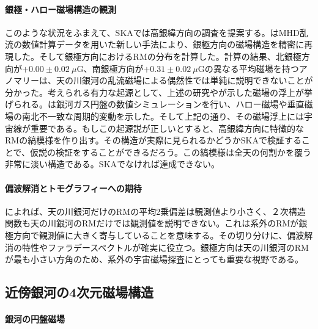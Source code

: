 \paragraph{銀極・ハロー磁場構造の観測}

このような状況をふまえて、SKAでは高銀緯方向の調査を提案する。\citet{2013ApJ...767..150A}はMHD乱流の数値計算データを用いた新しい手法により、銀極方向の磁場構造を精密に再現した。そして銀極方向におけるRMの分布を計算した。計算の結果、北銀極方向が$+0.00\pm 0.02~\mu$G、南銀極方向が$+0.31 \pm 0.02~\mu$Gの異なる平均磁場を持つ\citep{2010ApJ...714.1170M}アノマリーは、天の川銀河の乱流磁場による偶然性では単純に説明できないことが分かった。考えられる有力な起源として、上述の研究や\cite{2013ApJ...764...81M}が示した磁場の浮上が挙げられる。\cite{2013ApJ...764...81M}は銀河ガス円盤の数値シミュレーションを行い、ハロー磁場や垂直磁場の南北不一致な周期的変動を示した。そして上記の通り、その磁場浮上には宇宙線が重要である\citep{015105}。もしこの起源説が正しいとすると、高銀緯方向に特徴的なRMの縞模様を作り出す。その構造が実際に見られるかどうかSKAで検証することで、仮説の検証をすることができるだろう。この縞模様は全天の何割かを覆う非常に淡い構造である。SKAでなければ達成できない。

\paragraph{偏波解消とトモグラフィーへの期待}

\citet{2013ApJ...767..150A}によれば、天の川銀河だけのRMの平均2乗偏差は観測値より小さく、２次構造関数も天の川銀河のRMだけでは観測値を説明できない。これは系外のRMが銀極方向で観測値に大きく寄与していることを意味する。その切り分けに、偏波解消の特性やファラデースペクトルが確実に役立つ。銀極方向は天の川銀河のRMが最も小さい方角のため\citep{2010MNRAS.409L..99S}、系外の宇宙磁場探査にとっても重要な視野である。


\subsection{近傍銀河の4次元磁場構造}
\label{c06.s3.ss3}

\paragraph{銀河の円盤磁場}

